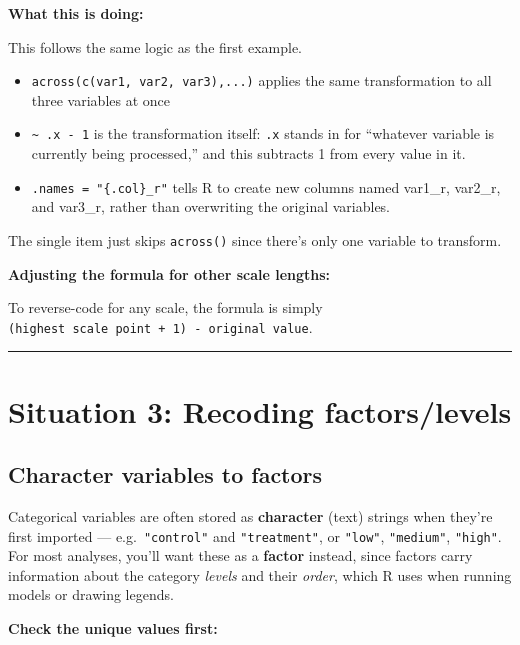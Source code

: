 \documentclass[
  letterpaper,
  DIV=11,
  numbers=noendperiod]{scrreprt}
\begin{document}
\textbf{What this is doing:}

This follows the same logic as the first example.

\begin{itemize}
\item
  \texttt{across(c(var1,\ var2,\ var3),...)} applies the same
  transformation to all three variables at once
\item
  \texttt{\textasciitilde{}\ .x\ -\ 1} is the transformation itself:
  \texttt{.x} stands in for ``whatever variable is currently being
  processed,'' and this subtracts 1 from every value in it.
\item
  \texttt{.names\ =\ "\{.col\}\_r"} tells R to create new columns named
  var1\_r, var2\_r, and var3\_r, rather than overwriting the original
  variables.
\end{itemize}

The single item just skips \texttt{across()} since there's only one
variable to transform.

\textbf{Adjusting the formula for other scale lengths:}

To reverse-code for any scale, the formula is simply
\texttt{(highest\ scale\ point\ +\ 1)\ -\ original\ value}.

\begin{center}\rule{0.5\linewidth}{0.5pt}\end{center}

\section{\texorpdfstring{\textbf{Situation 3: Recoding
factors/levels}}{Situation 3: Recoding factors/levels}}\label{situation-3-recoding-factorslevels}

\subsection{Character variables to
factors}\label{character-variables-to-factors}

Categorical variables are often stored as \textbf{character} (text)
strings when they're first imported --- e.g.~\texttt{"control"} and
\texttt{"treatment"}, or \texttt{"low"}, \texttt{"medium"},
\texttt{"high"}. For most analyses, you'll want these as a
\textbf{factor} instead, since factors carry information about the
category \emph{levels} and their \emph{order}, which R uses when running
models or drawing legends.

\textbf{Check the unique values first:}
\end{document}

